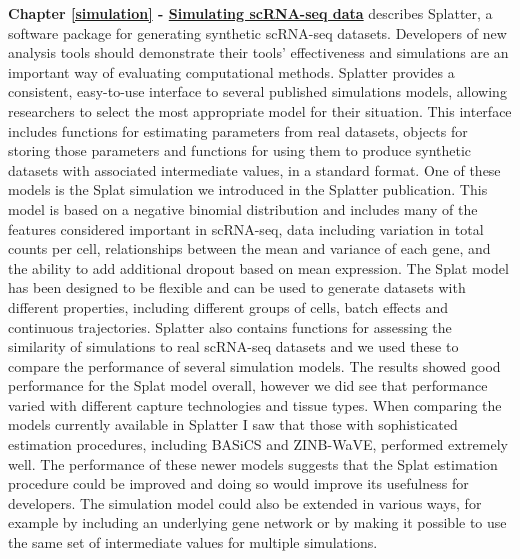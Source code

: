 \documentclass[11pt,a4paper,titlepage,twoside,openright]{style/unimelbthesis}
\theoremstyle{definition}
\theoremstyle{definition}
\theoremstyle{definition}
\theoremstyle{remark}
\begin{document}
\begin{mainmatter}
\textbf{Chapter \ref{simulation} - \protect\hyperlink{simulation}{Simulating scRNA-seq data}} describes Splatter, a software package for generating synthetic scRNA-seq datasets. Developers of new analysis tools should demonstrate their tools' effectiveness and simulations are an important way of evaluating computational methods. Splatter provides a consistent, easy-to-use interface to several published simulations models, allowing researchers to select the most appropriate model for their situation. This interface includes functions for estimating parameters from real datasets, objects for storing those parameters and functions for using them to produce synthetic datasets with associated intermediate values, in a standard format. One of these models is the Splat simulation we introduced in the Splatter publication. This model is based on a negative binomial distribution and includes many of the features considered important in scRNA-seq, data including variation in total counts per cell, relationships between the mean and variance of each gene, and the ability to add additional dropout based on mean expression. The Splat model has been designed to be flexible and can be used to generate datasets with different properties, including different groups of cells, batch effects and continuous trajectories. Splatter also contains functions for assessing the similarity of simulations to real scRNA-seq datasets and we used these to compare the performance of several simulation models. The results showed good performance for the Splat model overall, however we did see that performance varied with different capture technologies and tissue types. When comparing the models currently available in Splatter I saw that those with sophisticated estimation procedures, including BASiCS and ZINB-WaVE, performed extremely well. The performance of these newer models suggests that the Splat estimation procedure could be improved and doing so would improve its usefulness for developers. The simulation model could also be extended in various ways, for example by including an underlying gene network or by making it possible to use the same set of intermediate values for multiple simulations.


\end{mainmatter}
\end{document}
